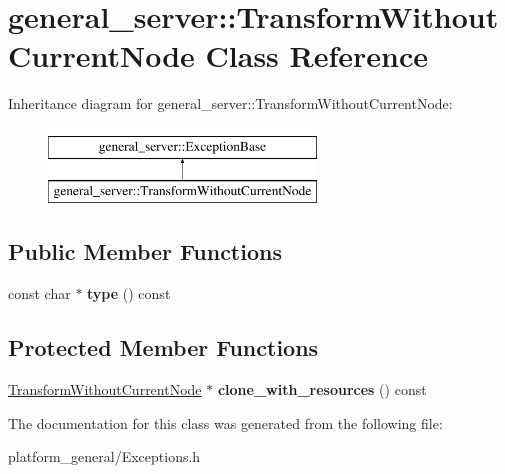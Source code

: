 \hypertarget{classgeneral__server_1_1TransformWithoutCurrentNode}{\section{general\-\_\-server\-:\-:\-Transform\-Without\-Current\-Node \-Class \-Reference}
\label{classgeneral__server_1_1TransformWithoutCurrentNode}
}
\-Inheritance diagram for general\-\_\-server\-:\-:\-Transform\-Without\-Current\-Node\-:\begin{figure}[H]
\begin{center}
\leavevmode
\includegraphics[height=2.000000cm]{classgeneral__server_1_1TransformWithoutCurrentNode}
\end{center}
\end{figure}
\subsection*{\-Public \-Member \-Functions}
\begin{DoxyCompactItemize}
\item 
\hypertarget{classgeneral__server_1_1TransformWithoutCurrentNode_a7a11fac63dcb9c73c0afaee17afac860}{const char $\ast$ {\bfseries type} () const }\label{classgeneral__server_1_1TransformWithoutCurrentNode_a7a11fac63dcb9c73c0afaee17afac860}

\end{DoxyCompactItemize}
\subsection*{\-Protected \-Member \-Functions}
\begin{DoxyCompactItemize}
\item 
\hypertarget{classgeneral__server_1_1TransformWithoutCurrentNode_a6808d9a4b9fe8593ecb6ba9620317697}{\hyperlink{classgeneral__server_1_1TransformWithoutCurrentNode}{\-Transform\-Without\-Current\-Node} $\ast$ {\bfseries clone\-\_\-with\-\_\-resources} () const }\label{classgeneral__server_1_1TransformWithoutCurrentNode_a6808d9a4b9fe8593ecb6ba9620317697}

\end{DoxyCompactItemize}


\-The documentation for this class was generated from the following file\-:\begin{DoxyCompactItemize}
\item 
platform\-\_\-general/\-Exceptions.\-h\end{DoxyCompactItemize}
